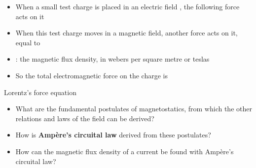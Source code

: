 \ELhold


\begin{ELunit}


\end{ELunit}

\ELhold


\begin{ELunit}

\begin{itemize}
\tightlist
\item
  When a small test charge is placed in an electric field , the following force acts on it
\end{itemize}


\begin{itemize}
\tightlist
\item
  When this test charge moves in a magnetic field, another force acts on it, equal to
\end{itemize}


\end{ELunit}

\begin{ELjoin}

\begin{itemize}
\tightlist
\item
  : the magnetic flux density, in webers per square metre or teslas
\item
  So the total electromagnetic force on the charge  is
\end{itemize}

\begin{ELimportant}{Lorentz's force equation}


\end{ELimportant}

\end{ELjoin}

\begin{ELunit}


\begin{itemize}
\tightlist
\item
  What are the fundamental postulates of magnetostatics, from which the other relations and laws of the field can be derived?
\item
  How is \textbf{Ampère's circuital law} derived from these postulates?
\item
  How can the magnetic flux density of a current be found with Ampère's circuital law?
\end{itemize}

\end{ELunit}

